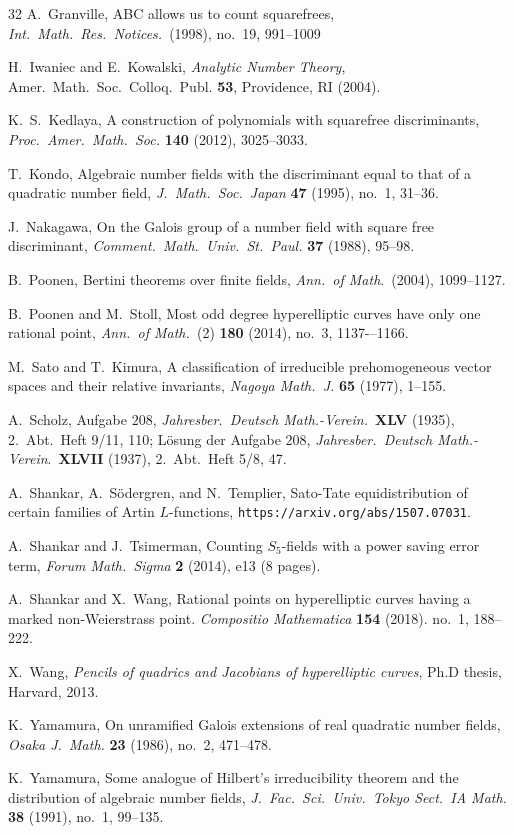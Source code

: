 \documentclass[11pt]{article}
\begin{document}
\begin{thebibliography}{32}
 A.\ Granville, ABC allows us to count squarefrees,
  {\it Int.\ Math.\ Res.\ Notices.}\ (1998), no.\ 19, 991--1009


 H.\ Iwaniec and E.\ Kowalski, {\it Analytic Number Theory},
  {Amer.\ Math.\ Soc.\ Colloq.\ Publ.} {\bf 53}, Providence, RI (2004).

K.\ S.\ Kedlaya, A construction of polynomials with squarefree discriminants,
{\it Proc.\ Amer.\ Math.\ Soc.} {\bf 140} (2012), 3025--3033.

T.\ Kondo, Algebraic number fields with the discriminant equal to that of a
quadratic number field, {\it J.\ Math.\ Soc.\ Japan} {\bf 47} (1995),
no.\ 1, 31--36.

J.\ Nakagawa, On the Galois group of a number field with square free discriminant,
{\it Comment.\  Math.\  Univ.\ St.\ Paul.} {\bf 37} (1988), 95--98.

 B.\ Poonen, Bertini theorems over finite fields,
  {\it Ann.\ of Math}.\ (2004), 1099--1127.

B.\ Poonen and M.\ Stoll,
Most odd degree hyperelliptic curves have only one rational point,
{\it Ann.\ of Math.\ }(2) \textbf{180} (2014), no.\ 3, 1137-–1166.

M.\ Sato and T.\ Kimura, A classification of irreducible
prehomogeneous vector spaces and their relative invariants,
{\it Nagoya Math.\ J.} {\bf 65} (1977), 1--155.

A.\ Scholz,  Aufgabe $208$,
{\it Jahresber.\ Deutsch Math.-Verein.}~{\bf XLV} (1935), 2.\ Abt.\ Heft 9/11, 110;
L\"osung der Aufgabe $208$,  {\it Jahresber.\ Deutsch Math.-Verein}.~{\bf XLVII} (1937), 2.\ Abt.\ Heft 5/8, 47.

 A.\ Shankar, A.\ S{\"o}dergren, and N.\ Templier,
  Sato-Tate equidistribution of certain families of Artin
  $L$-functions, {\tt https://arxiv.org/abs/1507.07031}.

 A.\ Shankar and J.\ Tsimerman, Counting $S_5$-fields with a
  power saving error term, {\it Forum Math.\ Sigma} \textbf{2} (2014), e13 (8 pages).

 A.\ Shankar and X.\ Wang, Rational points on hyperelliptic curves having a marked non-Weierstrass point. {\it Compositio Mathematica} \textbf{154} (2018). no.\ 1, 188--222.

 X.\ Wang, {\it Pencils of quadrics and Jacobians of
  hyperelliptic curves}, Ph.D thesis, Harvard, 2013.

K.\ Yamamura,
On unramified Galois extensions of real quadratic number fields,
{\it Osaka J.\ Math.} {\bf 23} (1986), no.\ 2, 471--478.

K.\ Yamamura, Some analogue of Hilbert's irreducibility theorem and
the distribution of algebraic number fields, {\it J.\ Fac.\ Sci.\ Univ.\ Tokyo Sect.\ IA Math.}
{\bf 38} (1991), no.\ 1, 99--135.



\end{thebibliography}
\end{document}

